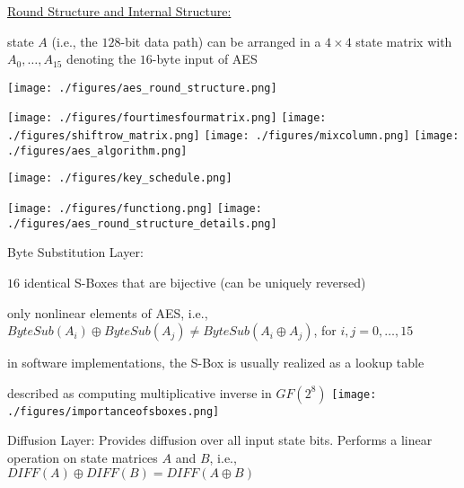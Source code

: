 \documentclass[landscape, a4paper]{article}
\begin{document}
\begin{minipage}[t]{0.198\pagewidth}
\begin{betterlist}
\begin{betterlist}
\begin{betterlist}
			\end{betterlist}
		\end{betterlist}
		\item \underline{Round Structure and Internal Structure:}
		\begin{betterlist}
			\item state $A$ (i.e., the $128$-bit data path) can be arranged in a $4\times 4$ \alert{state matrix} with $A_0,\ldots, A_{15}$ denoting the $16$-byte input of AES
		\end{betterlist}
		\begin{minipage}[b]{0.64\linewidth}
			\texttt{[image: ./figures/aes\_round\_structure.png]}
		\end{minipage}
		\begin{minipage}[b]{0.34\linewidth}
			\texttt{[image: ./figures/fourtimesfourmatrix.png]}
			\texttt{[image: ./figures/shiftrow\_matrix.png]}
			\texttt{[image: ./figures/mixcolumn.png]}
			\texttt{[image: ./figures/aes\_algorithm.png]}
		\end{minipage}
		\begin{minipage}[b]{0.49\linewidth}
			\texttt{[image: ./figures/key\_schedule.png]}
		\end{minipage}
		\begin{minipage}[b]{0.49\linewidth}
			\texttt{[image: ./figures/functiong.png]}
			\texttt{[image: ./figures/aes\_round\_structure\_details.png]}
		\end{minipage}
		\begin{betterlist}
			\item \alert{Byte Substitution Layer:}
			\begin{betterlist}
				\item $16$ \alert{identical} S-Boxes that are \alert{bijective} (can be \alert{uniquely reversed})
				\item only \alert{nonlinear} elements of AES, i.e., $ByteSub(A_i) \oplus ByteSub(A_j) \ne ByteSub(A_i \oplus A_j)$, for $i, j = 0,\ldots,15$
				\item in software implementations, the S-Box is usually realized as a lookup table
				\item described as computing \alert{multiplicative inverse} in $GF(2^8)$
				\texttt{[image: ./figures/importanceofsboxes.png]}
			\end{betterlist}
			\item \alert{Diffusion Layer:} Provides diffusion over all input state bits. Performs a linear operation on state matrices $A$ and $B$, i.e., $DIFF(A) \oplus DIFF(B) = DIFF(A \oplus B)$

\end{betterlist}
\end{betterlist}
\end{minipage}
\end{document}
